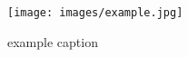 \begin{figure}[htbp] %
   \centering
   \texttt{[image: images/example.jpg]} 
   \caption{example caption}
\end{figure}

\endinput  %